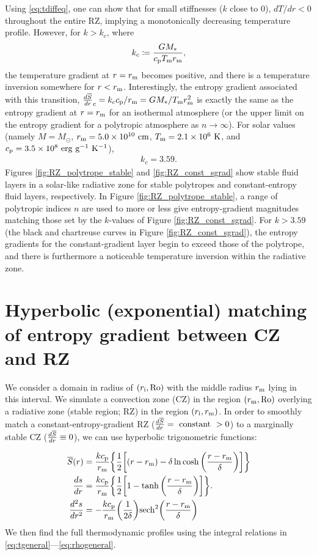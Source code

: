 \documentclass[12pt]{article} %
\newcommand{\rrm}{r_{\rm{m}}}
\newcommand{\ri}{r_{\rm{i}}}
\begin{document}
Using \eqref{eq:tdiffeq}, one can show that for small stiffnesses ($k$ close to $0$), $dT/dr < 0$ throughout the entire RZ, implying a monotonically decreasing temperature profile. However, for $k>k_c$, where
\begin{align}
k_c\coloneqq \frac{G\mstar}{\cp T_{\rm{m}}\rrm},
\end{align}
the temperature gradient at $r=\rrm$ becomes positive, and there is a temperature inversion somewhere for $r<\rrm$. Interestingly, the entropy gradient associated with this transition, $\dsdr_c=k_c\cp/\rrm=G\mstar/T_{\rm{m}}\rrm^2$ is exactly the same as the entropy gradient at $r=\rrm$ for an isothermal atmosphere (or the upper limit on the entropy gradient for a polytropic atmosphere as $n\rightarrow\infty$). For solar values (namely $M=M_\odot$, $\rrm = 5.0\times10^{10}\ \rm{cm}$, $T_{\rm{m}} = 2.1\times10^6\ \rm{K}$, and $\cp=3.5\times10^8\ \rm{erg\ g^{-1}\ K^{-1}}$),
\begin{align}
k_c = 3.59.
\label{eq:kc_solar}
\end{align}
Figures \ref{fig:RZ_polytrope_stable} and \ref{fig:RZ_const_sgrad} show stable fluid layers in a solar-like radiative zone for stable polytropes and constant-entropy fluid layers, respectively. In Figure \ref{fig:RZ_polytrope_stable}, a range of polytropic indices $n$ are used to more or less give entropy-gradient magnitudes matching those set by the $k$-values of Figure \ref{fig:RZ_const_sgrad}. For $k>3.59$ (the black and chartreuse curves in Figure \ref{fig:RZ_const_sgrad}), the entropy gradients for the constant-gradient layer begin to exceed those of the polytrope, and there is furthermore a noticeable temperature inversion within the radiative zone.

\section{Hyperbolic (exponential)  matching of entropy gradient between CZ and RZ}
We consider a domain in radius of $(\ri,\ro)$ with the middle radius $\rrm$ lying in this interval. We simulate a convection zone (CZ) in the region $(\rrm, \ro)$ overlying a radiative zone (stable region; RZ) in the region $(\ri,\rrm)$. In order to smoothly match a constant-entropy-gradient RZ ($\frac{d\overline{S}}{dr}=\ \rm{constant}\ > 0$) to a marginally stable CZ ($\frac{d\overline{S}}{dr}\equiv 0$), we can use hyperbolic trigonometric functions:

\begin{align}
\sref\ofr &= \frac{k\cp}{\rrm}\bigg{\{}\frac{1}{2}{\bigg{[}(r-\rrm) -\delta\ln\cosh{\bigg{(}\frac{r-\rrm}{\delta}\bigg{)}\bigg{]}}\bigg{\}}}\label{eq:s_tanh_transition}\\
\frac{ds}{dr} &= \frac{k\cp}{\rrm}\bigg{\{}\frac{1}{2}\bigg{[}1 - \tanh{\bigg{(}\frac{r-\rrm}{\delta}\bigg{)}}\bigg{]}\bigg{\}}.\label{eq:dsdr_tanh_transition}\\
\frac{d^2s}{dr^2} &= -\frac{k\cp}{\rrm}\bigg{(}\frac{1}{2\delta}\bigg{)}{\rm{sech}}^2\bigg{(}\frac{r-\rrm}{\delta}\bigg{)}
\end{align}
We then find the full thermodynamic profiles using the integral relations in \eqref{eq:tgeneral}---\eqref{eq:rhogeneral}.
\end{document}
